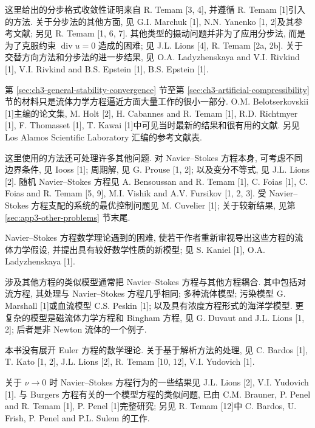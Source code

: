 这里给出的分步格式收敛性证明来自 R. Temam [3, 4], 并遵循 R. Temam [1]引入的方法. 关于分步法的其他方面, 见 G.I. Marchuk [1], N.N. Yanenko [1, 2]及其参考文献; 另见 R. Temam [1, 6, 7]. 其他类型的摄动问题并非为了应用分步法, 而是为了克服约束 $\operatorname{div}u=0$ 造成的困难; 见 J.L. Lions [4], R. Temam [2a, 2b]. 关于交替方向方法和分步法的进一步结果, 见 O.A. Ladyzhenskaya and V.I. Rivkind [1], V.I. Rivkind and B.S. Epstein [1], B.S. Epstein [1].

\hypertarget{comments-page-400}{}
第 \ref{sec:ch3-general-stability-convergence} 节至第 \ref{sec:ch3-artificial-compressibility} 节的材料只是流体力学方程逼近方面大量工作的很小一部分. O.M. Belotserkovskii [1]主编的论文集, M. Holt [2], H. Cabannes and R. Temam [1], R.D. Richtmyer [1], F. Thomasset [1], T. Kawai [1]中可见当时最新的结果和很有用的文献. 另见 Los Alamos Scientific Laboratory 汇编的参考文献表.

这里使用的方法还可处理许多其他问题. 对 Navier--Stokes 方程本身, 可考虑不同边界条件, 见 Iooss [1]; 周期解, 见 G. Prouse [1, 2]; 以及变分不等式, 见 J.L. Lions [2]. 随机 Navier--Stokes 方程见 A. Bensoussan and R. Temam [1], C. Foias [1], C. Foias and R. Temam [5, 9], M.I. Vishik and A.V. Fursikov [1, 2, 3]. 受 Navier--Stokes 方程支配的系统的最优控制问题见 M. Cuvelier [1]; 关于较新结果, 见第 \ref{sec:app3-other-problems} 节末尾.

Navier--Stokes 方程数学理论遇到的困难, 使若干作者重新审视导出这些方程的流体力学假设, 并提出具有较好数学性质的新模型; 见 S. Kaniel [1], O.A. Ladyzhenskaya [1].

涉及其他方程的类似模型通常把 Navier--Stokes 方程与其他方程耦合. 其中包括对流方程, 其处理与 Navier--Stokes 方程几乎相同; 多种流体模型; 污染模型 G. Marshall [1]或血流模型 C.S. Peskin [1]; 以及具有浓度方程形式的海洋学模型. 更复杂的模型是磁流体力学方程和 Bingham 方程, 见 G. Duvaut and J.L. Lions [1, 2]; 后者是非 Newton 流体的一个例子.

本书没有展开 Euler 方程的数学理论. 关于基于解析方法的处理, 见 C. Bardos [1], T. Kato [1, 2], J.L. Lions [2], R. Temam [10, 12], V.I. Yudovich [1].

关于 $\nu\to0$ 时 Navier--Stokes 方程行为的一些结果见 J.L. Lions [2], V.I. Yudovich [1]. 与 Burgers 方程有关的一个模型方程的类似问题, 已由 C.M. Brauner, P. Penel and R. Temam [1], P. Penel [1]完整研究; 另见 R. Temam [12]中 C. Bardos, U. Frish, P. Penel and P.L. Sulem 的工作.

\hypertarget{comments-page-401}{}
\clearpage
\thispagestyle{empty}
\null

\hypertarget{comments-page-402}{}
\clearpage
